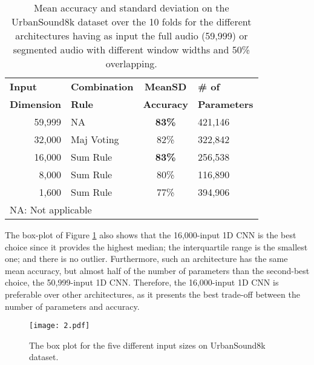 \documentclass[preprint,final,12pt]{elsarticle}
\begin{document}
\begin{table*}[htpb!]
\caption{Mean accuracy and standard deviation on the UrbanSound8k dataset over the 10 folds for the different architectures having as input the full audio (59,999) or segmented audio with different window widths and 50\% overlapping.}
\centering
\footnotesize
\begin{tabular}{l l c l}
\hline\hline \textbf{Input} & \textbf{Combination} & \textbf{MeanSD} & \textbf{\# of } \\
\textbf{Dimension} &   \textbf{Rule} & \textbf{Accuracy} & \textbf{Parameters} \\ \hline
\multicolumn{1}{r}{59,999}                                    & NA                                    & \textbf{83\%} & 421,146          \\
\multicolumn{1}{r}{32,000}                                    & Maj Voting                         & 82\% &  322,842         \\
\multicolumn{1}{r}{16,000}                                    & Sum Rule                                & \textbf{83\%} & 256,538          \\
\multicolumn{1}{r}{8,000}                                     & Sum Rule                                & 80\% &  116,890        \\
\multicolumn{1}{r}{1,600}                                     & Sum Rule                                & 77\% &  394,906        \\ \hline
\multicolumn{4}{l}{\scriptsize{NA: Not applicable }}
\end{tabular}
\label{table:framing_acc}
\end{table*}


The box-plot of Figure \ref{fig:boxframing} also shows that the 16,000-input 1D CNN is the best choice since it provides the highest median; the interquartile range is the smallest one; and there is no outlier. Furthermore, such an architecture has the same mean accuracy, but almost half of the number of parameters than the second-best choice, the 50,999-input 1D CNN. Therefore, the 16,000-input 1D CNN is preferable over other architectures, as it presents the best trade-off between the number of parameters and accuracy. 

\begin{figure}[htpb!]
  \centering
  \centerline{\texttt{[image: 2.pdf]}}
\caption{The box plot for the five different input sizes on UrbanSound8k dataset.}
\label{fig:boxframing}
\end{figure}
\end{document}

